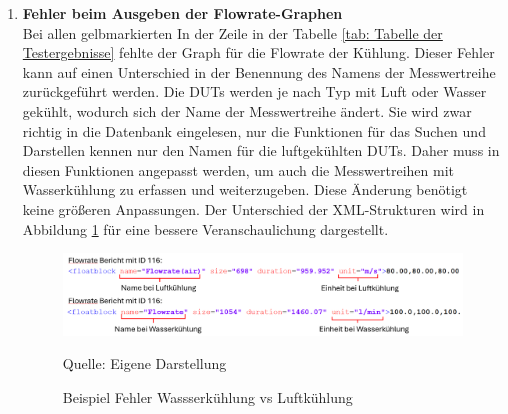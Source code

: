 \begin{enumerate}
\item \textbf{Fehler beim Ausgeben der Flowrate-Graphen} \\
Bei allen gelbmarkierten In der Zeile in der Tabelle \ref{tab: Tabelle der Testergebnisse} fehlte der Graph für die Flowrate der Kühlung.
Dieser Fehler kann auf einen Unterschied in der Benennung des Namens der Messwertreihe zurückgeführt werden.
Die DUTs werden je nach Typ mit Luft oder Wasser gekühlt, wodurch sich der Name der Messwertreihe ändert.
Sie wird zwar richtig in die Datenbank eingelesen, nur die Funktionen für das Suchen und Darstellen kennen nur den Namen für die luftgekühlten DUTs.
Daher muss in diesen Funktionen angepasst werden, um auch die Messwertreihen mit Wasserkühlung zu erfassen und weiterzugeben.
Diese Änderung benötigt keine größeren Anpassungen.
Der Unterschied der XML-Strukturen wird in Abbildung \ref{fig:Beispiel Fehler Wassserkühlung vs Luftkühlung} für eine bessere Veranschaulichung dargestellt.

    \begin{figure}[H]
    \centering
    \includegraphics[width=1\textwidth]{Grafiken/Beispiel Fehler Wasserkuehlung vs Luftkuehlung.png}
    \caption{Beispiel Fehler Wassserkühlung vs Luftkühlung}
    \label{fig:Beispiel Fehler Wassserkühlung vs Luftkühlung}
    {Quelle: Eigene Darstellung}

\end{figure}

\end{enumerate}

